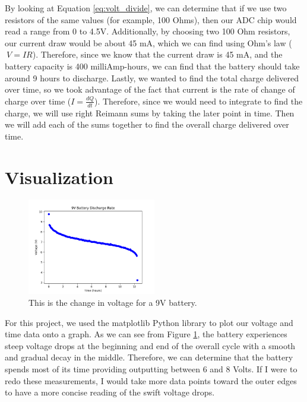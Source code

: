 \documentclass{article}
\begin{document}
By looking at Equation \ref{eq:volt_divide}, we can determine that if we use two resistors of the same values (for example, 100 Ohms), then our ADC chip would read a range from 0 to 4.5V. Additionally, by choosing two 100 Ohm resistors, our current draw would be about 45 mA, which we can find using Ohm’s law ($\ {V}={I}{R} $). Therefore, since we know that the current draw is 45 mA, and the battery capacity is 400 milliAmp-hours, we can find that the battery should take around 9 hours to discharge. \cite{datasheet}
Lastly, we wanted to find the total charge delivered over time, so we took advantage of the fact that current is the rate of change of charge over time (${I} = \frac{dQ}{dt}$). Therefore, since we would need to integrate to find the charge, we will use right Reimann sums by taking the later point in time. Then we will add each of the sums together to find the overall charge delivered over time.


\section{Visualization}
\begin{figure}[h]
    \centering
    \includegraphics[width=0.5\textwidth]{FinalBatteryDischarge.png}
    \caption{This is the change in voltage for a 9V battery.}
    \label{fig:voltdrop1}
\end{figure}

For this project, we used the matplotlib Python library to plot our voltage and time data onto a graph. As we can see from Figure \ref{fig:voltdrop1}, the battery experiences steep voltage drops at the beginning and end of the overall cycle with a smooth and gradual decay in the middle. Therefore, we can determine that the battery spends most of its time providing outputting between 6 and 8 Volts. If I were to redo these measurements, I would take more data points toward the outer edges to have a more concise reading of the swift voltage drops.
\end{document}
